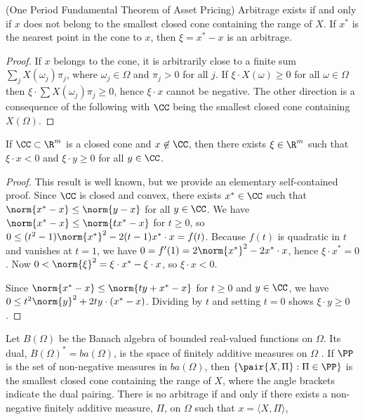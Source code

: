 \begin{theorem}{(One Period Fundamental Theorem of Asset Pricing)}
Arbitrage exists if and only if $x$ does not belong to the smallest
closed cone containing the range of $X$. If $x^*$ is the nearest point in
the cone to $x$, then $\xi = x^* - x$ is an arbitrage.
\end{theorem}

\begin{proof}
If $x$ belongs to the cone, it is arbitrarily close to a finite sum
$\sum_j X(\omega_j) \pi_j$, where $\omega_j\in\Omega$ and $\pi_j > 0$ for
all $j$. If $\xi\cdot X(\omega) \ge0$ for all $\omega\in\Omega$ then $\xi\cdot
\sum X(\omega_j) \pi_j \ge0$, hence $\xi\cdot x$ cannot be negative. The
other direction is a consequence of the following with $\CC$ being the
smallest closed cone containing $X(\Omega)$.
\end{proof}

\begin{lemma}
If $\CC\subset\R^m$ is a closed cone and $x\not\in \CC$, then there
exists $\xi\in\R^m$ such that $\xi\cdot x < 0$ and $\xi\cdot y \ge0$
for all $y\in \CC$.
\end{lemma}

\begin{proof}
This result is well known, but we provide an elementary self-contained
proof.  Since $\CC$ is closed and convex, there exists $x^*\in \CC$
such that $\norm{x^* - x} \le \norm{y - x}$ for all $y\in \CC$.
We have $\norm{x^* - x} \le \norm{tx^* - x}$ for $t \ge 0$, so $0 \le
(t^2 - 1)\norm{x^*}^2 - 2(t - 1)x^{*}\cdot x = f(t)$. Because $f(t)$
is quadratic in $t$ and vanishes at $t = 1$, we have $0 = f'(1) =
2\norm{x^*}^2 - 2x^{*}\cdot x$, hence $\xi\cdot x^* = 0$.  Now $0 <
\norm{\xi}^2 = \xi\cdot x^* - \xi\cdot x$, so $\xi\cdot x < 0$.

Since $\norm{x^* - x} \le \norm{ty + x^* - x}$ for $t \ge 0$ and $y\in
\CC$, we have $0 \le t^2\norm{y}^2 + 2ty\cdot(x^* - x)$. Dividing by $t$
and setting $t = 0$ shows $\xi\cdot y \ge0$.  \end{proof}

Let $B(\Omega)$ be the Banach algebra of bounded real-valued functions on
$\Omega$. Its dual, $B(\Omega)^* = ba(\Omega)$, is the space of finitely
additive measures on $\Omega$ \cite{DunSch1954}.  If $\PP$ is the set of
non-negative measures in $ba(\Omega)$, then $\{\pair{X,\Pi}:\Pi\in\PP\}$
is the smallest closed cone containing the range of $X$,
where the angle brackets indicate the dual pairing.
There is no
arbitrage if and only if there exists a non-negative finitely additive
measure, $\Pi$, on $\Omega$ such that $x = \langle X,\Pi\rangle$,

